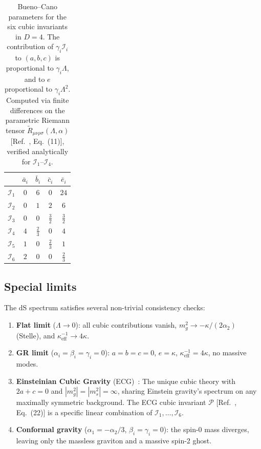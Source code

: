 \documentclass[aps,prd,twocolumn,superscriptaddress,nofootinbib]{revtex4-2}
\begin{document}
\begin{table}[t]
\caption{\label{tab:bc_params}%
Bueno--Cano parameters for the six cubic invariants in $D=4$.
The contribution of $\gamma_i\mathcal{I}_i$ to $(a,b,c)$ is
proportional to $\gamma_i\Lambda$, and to $e$ proportional to
$\gamma_i\Lambda^2$.  Computed via finite differences on the
parametric Riemann tensor $\tilde R_{\mu\nu\rho\sigma}(\Lambda,\alpha)$
[Ref.~\cite{BuenoCano2016}, Eq.~(11)], verified analytically for
$\mathcal{I}_1$--$\mathcal{I}_4$.}
\begin{ruledtabular}
\begin{tabular}{ccccc}
 & $\bar a_i$ & $\bar b_i$ & $\bar c_i$ & $\bar e_i$ \\
\midrule
$\mathcal{I}_1$ & $0$ & $6$ & $0$ & $24$ \\[2pt]
$\mathcal{I}_2$ & $0$ & $1$ & $2$ & $6$ \\[2pt]
$\mathcal{I}_3$ & $0$ & $0$ & $\tfrac{3}{2}$ & $\tfrac{3}{2}$ \\[2pt]
$\mathcal{I}_4$ & $4$ & $\tfrac{2}{3}$ & $0$ & $4$ \\[2pt]
$\mathcal{I}_5$ & $1$ & $0$ & $\tfrac{2}{3}$ & $1$ \\[2pt]
$\mathcal{I}_6$ & $2$ & $0$ & $0$ & $\tfrac{2}{3}$ \\
\end{tabular}
\end{ruledtabular}
\end{table}

\subsection{Special limits}

The dS spectrum satisfies several non-trivial consistency checks:

\begin{enumerate}
\item \textbf{Flat limit} ($\Lambda\to 0$): all cubic contributions
  vanish, $m_g^2 \to -\kappa/(2\alpha_2)$ (Stelle), and $\kappa_\mathrm{eff}^{-1}\to 4\kappa$.

\item \textbf{GR limit} ($\alpha_i=\beta_i=\gamma_i=0$): $a=b=c=0$,
  $e=\kappa$, $\kappa_\mathrm{eff}^{-1}=4\kappa$, no massive modes.

\item \textbf{Einsteinian Cubic Gravity} (ECG)~\cite{BuenoCano2016}:
  The unique cubic theory with $2a+c=0$ and $|m_g^2|=|m_s^2|=\infty$,
  sharing Einstein gravity's spectrum on any maximally symmetric
  background.  The ECG cubic invariant $\mathcal{P}$
  [Ref.~\cite{BuenoCano2016}, Eq.~(22)] is a specific linear
  combination of $\mathcal{I}_1,\ldots,\mathcal{I}_6$.

\item \textbf{Conformal gravity} ($\alpha_1=-\alpha_2/3$,
  $\beta_i=\gamma_i=0$): the spin-0 mass diverges, leaving only the
  massless graviton and a massive spin-2 ghost.
\end{enumerate}
\end{document}

